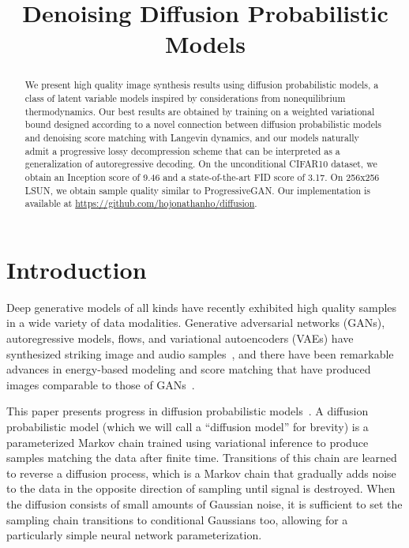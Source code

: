 \title{Denoising Diffusion Probabilistic Models}

\begin{abstract}
We present high quality image synthesis results using diffusion probabilistic models, a class of latent variable models inspired by considerations from nonequilibrium thermodynamics. Our best results are obtained by training on a weighted variational bound designed according to a novel connection between diffusion probabilistic models and denoising score matching with Langevin dynamics, and our models naturally admit a progressive lossy decompression scheme that can be interpreted as a generalization of autoregressive decoding. On the unconditional CIFAR10 dataset, we obtain an Inception score of 9.46 and a state-of-the-art FID score of 3.17. On 256x256 LSUN, we obtain sample quality similar to ProgressiveGAN. Our implementation is available at \url{https://github.com/hojonathanho/diffusion}.
\end{abstract}

\section{Introduction}

Deep generative models of all kinds have recently exhibited high quality samples in a wide variety of data modalities. Generative adversarial networks (GANs), autoregressive models, flows, and variational autoencoders (VAEs) have synthesized striking image and audio samples~\citep{goodfellow2014generative,karras2018progressive,brock2018large,oord2016pixel,menick2018generating,kalchbrenner2017video,dinh2016density,kingma2018glow,prenger2019waveglow,oord2016wavenet,kalchbrenner2018efficient,kingma2013auto,razavi2019generating}, and there have been remarkable advances in energy-based modeling and score matching that have produced images comparable to those of GANs~\citep{du2019implicit,song2019generative}.

This paper presents progress in diffusion probabilistic models~\citep{sohl2015deep}. A diffusion probabilistic model (which we will call a ``diffusion model'' for brevity) is a parameterized Markov chain trained using variational inference to produce samples matching the data after finite time. Transitions of this chain are learned to reverse a diffusion process, which is a Markov chain that gradually adds noise to the data in the opposite direction of sampling until signal is destroyed. When the diffusion consists of small amounts of Gaussian noise, it is sufficient to set the sampling chain transitions to conditional Gaussians too, allowing for a particularly simple neural network parameterization.

